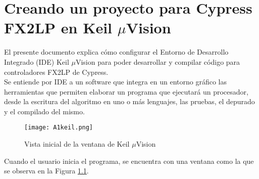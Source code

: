 \chapter{Creando un proyecto para Cypress FX2LP en Keil $\mu$Vision}
	\label{app:keil}
	El presente documento explica cómo configurar el Entorno de Desarrollo Integrado (IDE) Keil $\mu$Vision para poder desarrollar y compilar código para controladores FX2LP de Cypress.\\
	
	Se entiende por IDE a un software que integra en un entorno gráfico las herramientas que permiten elaborar un programa que ejecutará un procesador, desde la escritura del algoritmo en uno o más lenguajes, las pruebas, el depurado y el compilado del mismo.\\
	
	\begin{figure}[ht]
		\centering
		\texttt{[image: A1keil.png]}
		\caption{Vista inicial de la ventana de Keil $\mu$Vision}
		\label{initkeil}
	\end{figure}
	Cuando el usuario inicia el programa, se encuentra con una ventana como la que se observa en la Figura \ref{initkeil}.